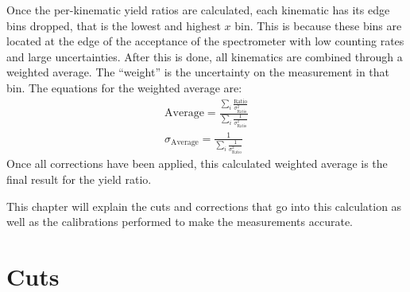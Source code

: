 Once the per-kinematic yield ratios are calculated, each kinematic has its edge bins dropped, that is the lowest and highest $x$ bin. This is because these bins are located at the edge of the acceptance of the spectrometer with low counting rates and large uncertainties. After this is done, all kinematics are combined through a weighted average. The ``weight'' is the uncertainty on the measurement in that bin. The equations for the weighted average are:
\begin{align}
	\text{Average} = \frac{\sum\limits_{i} \frac{\text{Ratio}}{\sigma^2_\text{Ratio}}}{\sum\limits_{i} \frac{1}{\sigma^2_\text{Ratio}}} \\
	\sigma_\text{Average} = \frac{1}{\sum\limits_{i} \frac{1}{\sigma^2_\text{Ratio}}}
\end{align}
Once all corrections have been applied, this calculated weighted average is the final result for the yield ratio.

This chapter will explain the cuts and corrections that go into this calculation as well as the calibrations performed to make the measurements accurate.

%



\section{Cuts}

